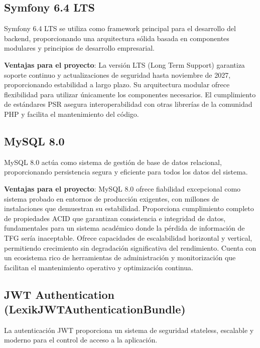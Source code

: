 \documentclass[12pt,a4paper,oneside]{report}
\begin{document}
\subsection{Symfony 6.4 LTS}\label{symfony-6.4-lts}

Symfony 6.4 LTS se utiliza como framework principal para el desarrollo
del backend, proporcionando una arquitectura sólida basada en
componentes modulares y principios de desarrollo empresarial.

\textbf{Ventajas para el proyecto}: La versión LTS (Long Term Support) garantiza soporte continuo y actualizaciones de seguridad hasta noviembre de 2027, proporcionando estabilidad a largo plazo. Su arquitectura modular ofrece flexibilidad para utilizar únicamente los componentes necesarios. El cumplimiento de estándares PSR asegura interoperabilidad con otras librerías de la comunidad PHP y facilita el mantenimiento del código.

\subsection{MySQL 8.0}\label{mysql-8.0}

MySQL 8.0 actúa como sistema de gestión de base de datos relacional,
proporcionando persistencia segura y eficiente para todos los datos del
sistema.

\textbf{Ventajas para el proyecto}: MySQL 8.0 ofrece fiabilidad excepcional como sistema probado en entornos de producción exigentes, con millones de instalaciones que demuestran su estabilidad. Proporciona cumplimiento completo de propiedades ACID que garantizan consistencia e integridad de datos, fundamentales para un sistema académico donde la pérdida de información de TFG sería inaceptable. Ofrece capacidades de escalabilidad horizontal y vertical, permitiendo crecimiento sin degradación significativa del rendimiento. Cuenta con un ecosistema rico de herramientas de administración y monitorización que facilitan el mantenimiento operativo y optimización continua.

\subsection{JWT Authentication
(LexikJWTAuthenticationBundle)}\label{jwt-authentication-lexikjwtauthenticationbundle}

La autenticación JWT proporciona un sistema de seguridad stateless,
escalable y moderno para el control de acceso a la aplicación.
\end{document}
